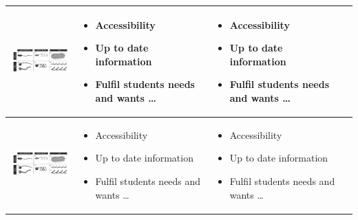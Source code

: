 \documentclass[a4paper,11pt]{article}
\begin{document}
\begin{sloppypar}
\begin{table}[h!]
\begin{tabular}{ c | m{3cm} | m{3cm} | m{3cm} }

 \begin{minipage}{.3\textwidth}
      \includegraphics[width=\linewidth, height=20mm]{cilia}
    \end{minipage}
    &
      \begin{itemize}
        \item Accessibility
        \item Up to date information
        \item Fulfil students needs and wants \ldots
      \end{itemize}
    & 
      \begin{itemize}
        \item Accessibility
        \item Up to date information
        \item Fulfil students needs and wants \ldots
      \end{itemize}
    \\ \hline


 \begin{minipage}{.3\textwidth}
      \includegraphics[width=\linewidth, height=20mm]{cilia}
    \end{minipage}
    &
      \begin{itemize}
        \item Accessibility
        \item Up to date information
        \item Fulfil students needs and wants \ldots
      \end{itemize}
    & 
      \begin{itemize}
        \item Accessibility
        \item Up to date information
        \item Fulfil students needs and wants \ldots
      \end{itemize}
    \\ \hline




\end{tabular}
\end{table}
\end{sloppypar}
\end{document}
